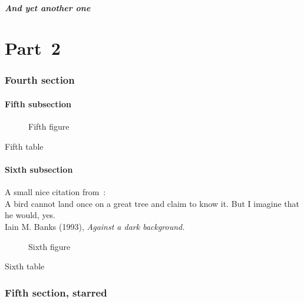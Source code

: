 \documentclass[oneside,12pt,a4paper]{article}
\begin{document}
\subsubsection{And yet another one}

\part{Part~2}
\parttoc \mtcskip \partlof \mtcskip \partlot

\section{Fourth section}
\secttoc \mtcskip \sectlof \mtcskip \sectlot
\subsection{Fifth subsection}

\begin{figure}[tp]
\caption{Fifth figure}
\end{figure}
\begin{table}[tp]
\caption{Fifth table}
\end{table}

\subsection{Sixth subsection}
A small nice citation from~\cite{dark}:\\
%
%
%
%
%
%
A bird cannot land once on a great tree and claim to know it.
But I imagine that he would, yes.\\
\hbox{}\hfill
Iain M. Banks (1993), \textsl{Against a dark background.}%
%

\begin{figure}[tp]
\caption{Sixth figure}
\end{figure}
\begin{table}
\caption{Sixth table}
\end{table}

\section*{Fifth section, starred}
\end{document}
